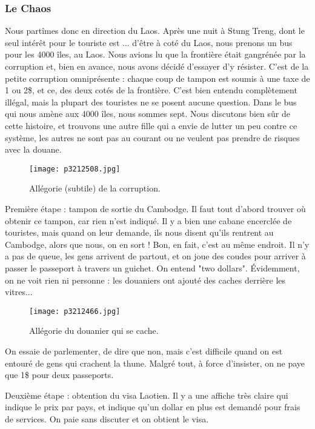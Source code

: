 \documentclass{book}
\begin{document}
\subsubsection{Le Chaos}
Nous partîmes donc en direction du Laos. Après une nuit à Stung Treng, dont le seul intérêt pour le touriste est ... d'être à coté du Laos, nous prenons un bus pour les 4000 îles, au Laos. Nous avions lu que la frontière était gangrénée par la corruption et, bien en avance, nous avons décidé d'essayer d'y résister. C'est de la petite corruption omniprésente : chaque coup de tampon est soumis à une taxe de 1 ou 2\$, et ce, des deux cotés de la frontière. C'est bien entendu complètement illégal, mais la plupart des touristes ne se posent aucune question. Dans le bus qui nous amène aux 4000 îles, nous sommes sept. Nous discutons bien sûr de cette histoire, et trouvons une autre fille qui a envie de lutter un peu contre ce système, les autres ne sont pas au courant ou ne veulent pas prendre de risques avec la douane.


\begin{figure}[h]
\centering
\texttt{[image: p3212508.jpg]}
\caption*{Allégorie (subtile) de la corruption.}
\end{figure}

Première étape : tampon de sortie du Cambodge. Il faut tout d'abord trouver où obtenir ce tampon, car rien n'est indiqué. Il y a bien une cabane encerclée de touristes, mais quand on leur demande, ils nous disent qu'ils rentrent au Cambodge, alors que nous, on en sort ! Bon, en fait, c'est au même endroit. Il n'y a pas de queue, les gens arrivent de partout, et on joue des coudes pour arriver à passer le passeport à travers un guichet. On entend "two dollars". Évidemment, on ne voit rien ni personne : les douaniers ont ajouté des caches derrière les vitres...


\begin{figure}[h]
\centering
\texttt{[image: p3212466.jpg]}
\caption*{Allégorie du douanier qui se cache.}
\end{figure}

On essaie de parlementer, de dire que non, mais c'est difficile quand on est entouré de gens qui crachent la thune. Malgré tout, à force d'insister, on ne paye que 1\$ pour deux passeports.

Deuxième étape : obtention du visa Laotien. Il y a une affiche très claire qui indique le prix par pays, et indique qu'un dollar en plus est demandé pour frais de services. On paie sans discuter et on obtient le visa.
\end{document}
